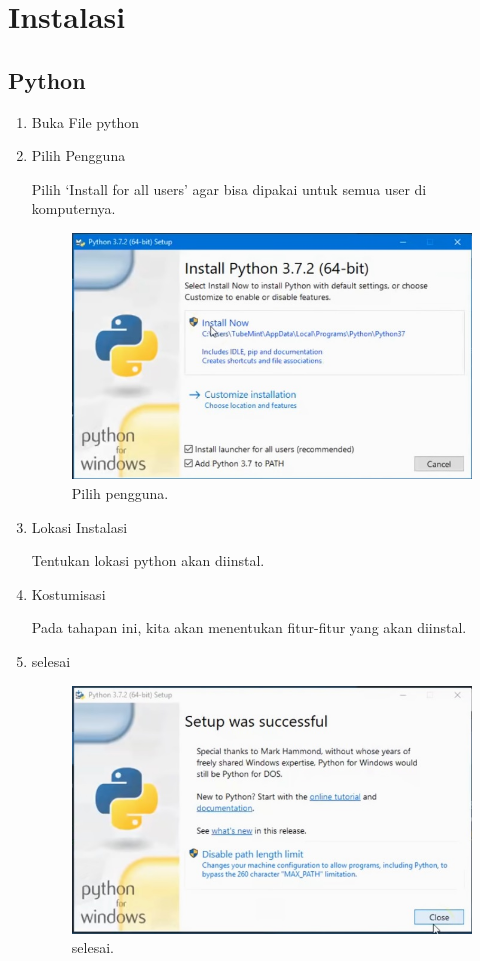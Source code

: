 \documentclass[lipt]{Article}
\begin{document}
\section{Instalasi}
\subsection{Python}
\begin{enumerate}
\item Buka File python

\item Pilih Pengguna

Pilih ‘Install for all users’ agar bisa dipakai untuk semua user di komputernya.

\begin{figure}[htbp]
\centerline{\includegraphics{chapters/gambar/start.jpg}}
\caption{Pilih pengguna.}
\label{fig}
\end{figure}

\item Lokasi Instalasi

Tentukan lokasi python akan diinstal. 

\item Kostumisasi

Pada tahapan ini, kita akan menentukan fitur-fitur yang akan diinstal.

\item selesai
\begin{figure}[htbp]
\centerline{\includegraphics{chapters/gambar/finish.jpg}}
\caption{selesai.}
\label{fig}
\end{figure}
\end{enumerate}
\end{document}
